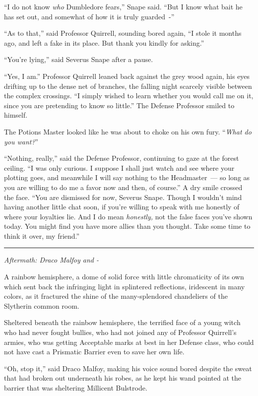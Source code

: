 ``I do not know \emph{who} Dumbledore fears,'' Snape said. ``But I know what bait he has set out, and somewhat of how it is truly guarded~-''

``As to that,'' said Professor Quirrell, sounding bored again, ``I stole it months ago, and left a fake in its place. But thank you kindly for asking.''

``You're lying,'' said Severus Snape after a pause.

``Yes, I am.'' Professor Quirrell leaned back against the grey wood again, his eyes drifting up to the dense net of branches, the falling night scarcely visible between the complex crossings. ``I simply wished to learn whether you would call me on it, since you are pretending to know so little.'' The Defense Professor smiled to himself.

The Potions Master looked like he was about to choke on his own fury. ``\emph{What do you want?}''

``Nothing, really,'' said the Defense Professor, continuing to gaze at the forest ceiling. ``I was only curious. I suppose I shall just watch and see where your plotting goes, and meanwhile I will say nothing to the Headmaster~--- so long as you are willing to do me a favor now and then, of course.'' A dry smile crossed the face. ``You are dismissed for now, Severus Snape. Though I wouldn't mind having another little chat soon, if you're willing to speak with me honestly of where your loyalties lie. And I do mean \emph{honestly,} not the false faces you've shown today. You might find you have more allies than you thought. Take some time to think it over, my friend.''

\begin{center}\rule{3in}{0.4pt}\end{center}

\emph{Aftermath: Draco Malfoy and -}

A rainbow hemisphere, a dome of solid force with little chromaticity of its own which sent back the infringing light in splintered reflections, iridescent in many colors, as it fractured the shine of the many-splendored chandeliers of the Slytherin common room.

Sheltered beneath the rainbow hemisphere, the terrified face of a young witch who had never fought bullies, who had not joined any of Professor Quirrell's armies, who was getting Acceptable marks at best in her Defense class, who could not have cast a Prismatic Barrier even to save her own life.

``Oh, stop it,'' said Draco Malfoy, making his voice sound bored despite the sweat that had broken out underneath his robes, as he kept his wand pointed at the barrier that was sheltering Millicent Bulstrode.

